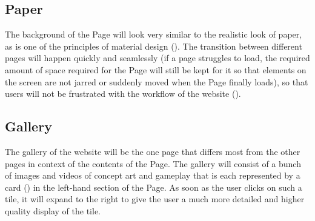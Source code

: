 \documentclass{article}
\begin{document}
    \subsection{Paper}
    The background of the Page will look very similar to the realistic look of paper, as is one of the principles of material design (\cite{principles}). The transition between different pages will happen quickly and seamlessly (if a page struggles to load, the required amount of space required for the Page will still be kept for it so that elements on the screen are not jarred or suddenly moved when the Page finally loads), so that users will not be frustrated with the workflow of the website (\cite{choreography}).
    
    \subsection{Gallery}
    The gallery of the website will be the one page that differs most from the other pages in context of the contents of the Page. The gallery will consist of a bunch of images and videos of concept art and gameplay that is each represented by a card (\cite{cards}) in the left-hand section of the Page. As soon as the user clicks on such a tile, it will expand to the right to give the user a much more detailed and higher quality display of the tile.
    
\end{document}
